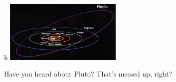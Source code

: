 \documentclass[11pt,a4paper]{article}
\begin{document}
\begin{figure}{h}
    \centering
    \includegraphics[width=0.5\textwidth]{orbitas.png}
    \caption{Have you heard about Pluto? That's messed up, right?}
\end{figure}
\end{document}
